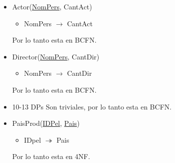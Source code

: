 \documentclass{article}
\begin{document}
\begin{itemize}
    \item Actor(\underline{NomPers}, CantAct)
      \begin{itemize}
          \item NomPers $\rightarrow$ CantAct
      \end{itemize}
      Por lo tanto esta en BCFN.
    \item Director(\underline{NomPers}, CantDir)
      \begin{itemize}
          \item NomPers $\rightarrow$ CantDir
      \end{itemize}
      Por lo tanto esta en BCFN.
    \item 10-13 DPs Son triviales, por lo tanto esta en BCFN.
    \item PaisProd(\underline{IDPel}, \underline{Pais})
      \begin{itemize}
          \item IDpel $\twoheadrightarrow$ Pais
      \end{itemize}
      Por lo tanto esta en 4NF.
  \end{itemize}
\end{document}
